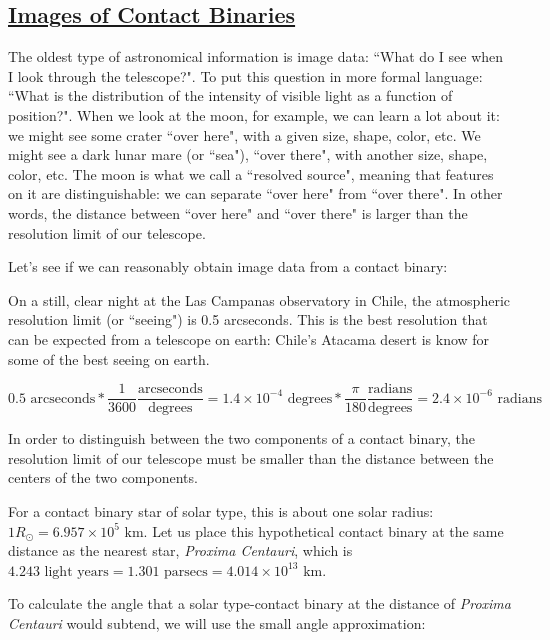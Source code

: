 \documentclass[12pt]{article} %
\numberwithin{equation}{section} %
\begin{document}
\subsection[Images of Contact Binaries]{\hyperlink{toc}{Images of Contact Binaries}} \label{sec: Images of Contact Binaries}

The oldest type of astronomical information is image data: ``What do I see when I look through the telescope?". To put this question in more formal language: ``What is the distribution of the intensity of visible light as a function of position?". When we look at the moon, for example, we can learn a lot about it: we might see some crater ``over here", with a given size, shape, color, etc. We might see a dark lunar mare (or ``sea"), ``over there", with another size, shape, color, etc. The moon is what we call a ``resolved source", meaning that features on it are distinguishable: we can separate ``over here" from ``over there". In other words, the distance between ``over here" and ``over there" is larger than the resolution limit of our telescope.

Let's see if we can reasonably obtain image data from a contact binary:

On a still, clear night at the Las Campanas observatory in Chile, the atmospheric resolution limit (or ``seeing") is 0.5 arcseconds. This is the best resolution that can be expected from a telescope on earth: Chile's Atacama desert is know for some of the best seeing on earth.

\begin{equation} \label{eqn: arcseconds}
0.5 \text{ arcseconds} * \frac{1}{3600} \frac{\text{arcseconds}}{\text{degrees}} = 1.4 \times 10^{-4} \text{ degrees} * \frac{\pi}{180} \frac{\text{radians}}{\text{degrees}} = 2.4 \times 10^{-6} \text{ radians}
\end{equation}

In order to distinguish between the two components of a contact binary, the resolution limit of our telescope must be smaller than the distance between the centers of the two components. 

For a contact binary star of solar type, this is about one solar radius: $1 R_{\odot} = 6.957 \times 10^{5} \text{ km}$. Let us place this hypothetical contact binary at the same distance as the nearest star, \emph{Proxima Centauri}, which is $4.243 \text{ light years} = 1.301 \text{ parsecs} = 4.014 \times 10^{13} \text{ km}$.

To calculate the angle that a solar type-contact binary at the distance of \emph{Proxima Centauri} would subtend, we will use the small angle approximation:
\end{document}

